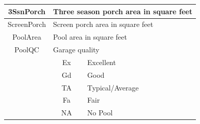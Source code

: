 \documentclass[11pt]{scrartcl} %
\begin{document}
\begin{center}
\begin{tabular}{c c c c c c}
\hline
\multicolumn{2}{|c}{3SsnPorch} & \multicolumn{4}{l|}{Three season porch area in square feet}\\
\hline
\multicolumn{2}{|c}{ScreenPorch} & \multicolumn{4}{l|}{Screen porch area in square feet}\\
\hline
\multicolumn{2}{|c}{PoolArea} & \multicolumn{4}{l|}{Pool area in square feet}\\
\hline
\multicolumn{2}{|c}{PoolQC} & \multicolumn{4}{l|}{Garage quality}\\ 
\multicolumn{2}{|c}{} & \multicolumn{1}{c}{Ex} & \multicolumn{3}{l|}{Excellent}\\
\multicolumn{2}{|c}{} & \multicolumn{1}{c}{Gd} & \multicolumn{3}{l|}{Good}\\
\multicolumn{2}{|c}{} & \multicolumn{1}{c}{TA} & \multicolumn{3}{l|}{Typical/Average}\\
\multicolumn{2}{|c}{} & \multicolumn{1}{c}{Fa} & \multicolumn{3}{l|}{Fair}\\
\multicolumn{2}{|c}{} & \multicolumn{1}{c}{NA} & \multicolumn{3}{l|}{No Pool}\\
\hline
\end{tabular}
\end{center}
\end{document}
